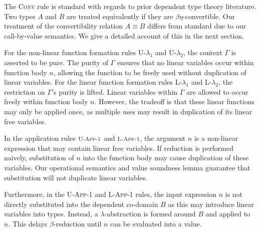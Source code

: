 \documentclass{article}
\newcommand{\rname}[1]{\textsc{\footnotesize #1}}
\begin{document}
  The \rname{Conv} rule is standard with regards to prior dependent type theory literature. Two types $A$ and $B$ are treated equivalently if they are $\beta\eta$-convertible. Our treatment of the convertibility relation $A \equiv B$ differs from standard due to our call-by-value semantics. We give a detailed account of this in the next section.

  For the non-linear function formation rules \rname{U-$\lambda_1$} and \rname{U-$\lambda_2$}, the context $\Gamma$ is asserted to be pure. The purity of $\Gamma$ ensures that no linear variables occur within function body $n$, allowing the function to be freely used without duplication of linear variables. For the linear function formation rules \rname{L-$\lambda_1$} and \rname{L-$\lambda_2$}, the restriction on $\Gamma$'s purity is lifted. Linear variables within $\Gamma$ are allowed to occur freely within function body $n$. However, the tradeoff is that these linear functions may only be applied once, as multiple uses may result in duplication of its linear free variables.

  In the application rules $\rname{U-App-1}$ and $\rname{L-App-1}$, the argument $n$ is a non-linear expression that may contain linear free variables. If reduction is performed naively, substitution of $n$ into the function body may cause duplication of these variables. Our operational semantics and value soundness lemma guarantee that substitution will not duplicate linear variables.

  Furthermore, in the \rname{U-App-1} and \rname{L-App-1} rules, the input expression $n$ is not directly substituted into the dependent co-domain $B$ as this may introduce linear variables into types. Instead, a $\lambda$-abstraction is formed around $B$ and applied to $n$. This delays $\beta$-reduction until $n$ can be evaluated into a value.
\end{document}
